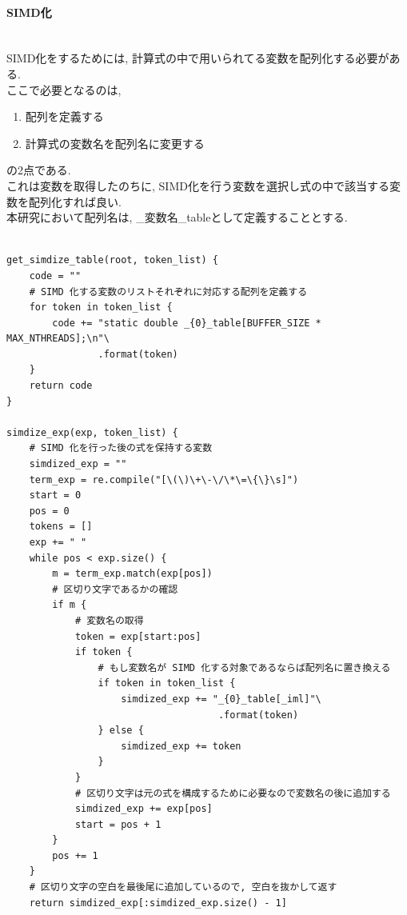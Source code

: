 \paragraph{SIMD化}~\\
SIMD化をするためには, 計算式の中で用いられてる変数を配列化する必要がある.\\
ここで必要となるのは,
\begin{enumerate}
\item 配列を定義する
\item 計算式の変数名を配列名に変更する
\end{enumerate}
の2点である.\\
これは変数を取得したのちに, SIMD化を行う変数を選択し式の中で該当する変数を配列化すれば良い.\\
本研究において配列名は, \_変数名\_tableとして定義することとする.\\
{\footnotesize
\begin{lstlisting}[caption=計算式内の変数の配列化,label=obtain-vars,numbers=none]

get_simdize_table(root, token_list) {
    code = ""
    # SIMD 化する変数のリストそれぞれに対応する配列を定義する
    for token in token_list {
        code += "static double _{0}_table[BUFFER_SIZE * MAX_NTHREADS];\n"\
                .format(token)
    }
    return code
}

simdize_exp(exp, token_list) {
    # SIMD 化を行った後の式を保持する変数
    simdized_exp = ""
    term_exp = re.compile("[\(\)\+\-\/\*\=\{\}\s]")
    start = 0
    pos = 0
    tokens = []
    exp += " "
    while pos < exp.size() {
        m = term_exp.match(exp[pos])
        # 区切り文字であるかの確認
        if m {
            # 変数名の取得
            token = exp[start:pos]
            if token {
                # もし変数名が SIMD 化する対象であるならば配列名に置き換える
                if token in token_list {
                    simdized_exp += "_{0}_table[_iml]"\
                                     .format(token)
                } else {
                    simdized_exp += token
                }
            }
            # 区切り文字は元の式を構成するために必要なので変数名の後に追加する
            simdized_exp += exp[pos]
            start = pos + 1
        }
        pos += 1
    }
    # 区切り文字の空白を最後尾に追加しているので, 空白を抜かして返す
    return simdized_exp[:simdized_exp.size() - 1]
\end{lstlisting}
}


